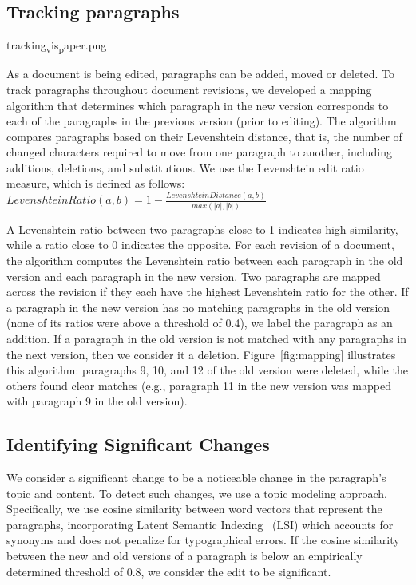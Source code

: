 \subsection{Tracking paragraphs}\label{tracking-paragraphs}

tracking\textsubscript{v}is\textsubscript{p}aper.png

As a document is being edited, paragraphs can be added, moved or
deleted. To track paragraphs throughout document revisions, we developed
a mapping algorithm that determines which paragraph in the new version
corresponds to each of the paragraphs in the previous version (prior to
editing). The algorithm compares paragraphs based on their Levenshtein
distance, that is, the number of changed characters required to move
from one paragraph to another, including additions, deletions, and
substitutions. We use the Levenshtein edit ratio measure, which is
defined as follows:
\(Levenshtein Ratio(a,b) = 1-\frac{Levenshtein Distance(a,b)}{max(|a|,|b|)} \)

A Levenshtein ratio between two paragraphs close to 1 indicates high
similarity, while a ratio close to 0 indicates the opposite. For each
revision of a document, the algorithm computes the Levenshtein ratio
between each paragraph in the old version and each paragraph in the new
version. Two paragraphs are mapped across the revision if they each have
the highest Levenshtein ratio for the other. If a paragraph in the new
version has no matching paragraphs in the old version (none of its
ratios were above a threshold of 0.4), we label the paragraph as an
addition. If a paragraph in the old version is not matched with any
paragraphs in the next version, then we consider it a deletion.
Figure~{[}fig:mapping{]} illustrates this algorithm: paragraphs 9, 10,
and 12 of the old version were deleted, while the others found clear
matches (e.g., paragraph 11 in the new version was mapped with paragraph
9 in the old version).

\subsection{Identifying Significant
Changes}\label{identifying-significant-changes}

We consider a significant change to be a noticeable change in the
paragraph's topic and content. To detect such changes, we use a topic
modeling approach. Specifically, we use cosine similarity between word
vectors that represent the paragraphs, incorporating Latent Semantic
Indexing~\cite{deerwester1990indexing} (LSI) which accounts for synonyms
and does not penalize for typographical errors. If the cosine similarity
between the new and old versions of a paragraph is below an empirically
determined threshold of 0.8, we consider the edit to be significant.

